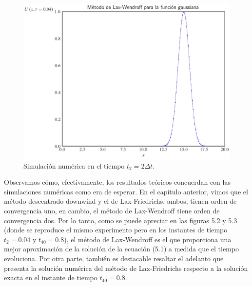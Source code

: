 \begin{figure}[ht!]
    \includegraphics[width=.35\paperwidth]{../snapshots/lax-wendroffgaussiana1d-2.png}
    \caption{Simulación numérica en el tiempo $t_{2}=2\Delta t$.}
    \label{fig:example1t2}
\end{figure}

Observamos cómo, efectivamente, los resultados teóricos concuerdan
con las simulaciones numéricas como era de esperar.
En el capítulo anterior, vimos que el método descentrado downwind y
el de Lax-Friedrichs, ambos, tienen orden de convergencia uno, en
cambio, el método de Lax-Wendroff tiene orden de convergencia dos.
Por lo tanto, como se puede apreciar en las ﬁguras 5.2 y 5.3
(donde se reproduce el mismo experimento pero en los instantes de
tiempo $t_{2}=0.04$ y $t_{40}=0.8$), el método de Lax-Wendroff es el
que proporciona una mejor aproximación de la solución de la ecuación
(5.1) a medida que el tiempo evoluciona.
Por otra parte, también es destacable resaltar el adelanto que
presenta la solución numérica del método de Lax-Friedrichs respecto a
la solución exacta en el instante de tiempo $t_{40}=0.8$.

